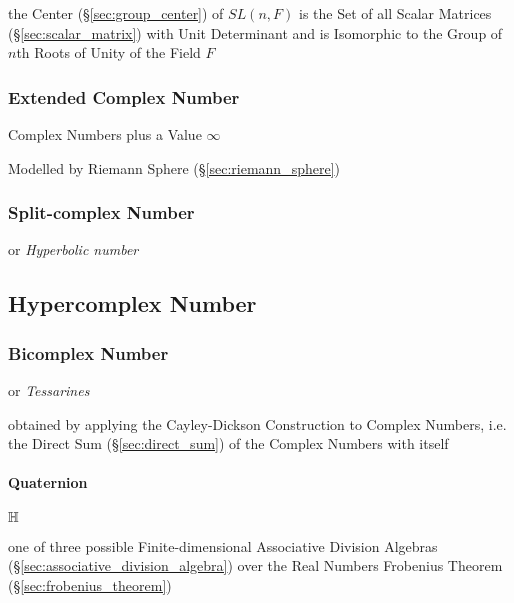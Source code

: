 the Center (\S\ref{sec:group_center}) of $SL(n,F)$ is the Set of all Scalar
Matrices (\S\ref{sec:scalar_matrix}) with Unit Determinant and is Isomorphic to
the Group of $n$th Roots of Unity of the Field $F$



\subsubsection{Extended Complex Number}\label{sec:extended_complex}

Complex Numbers plus a Value $\infty$

Modelled by Riemann Sphere (\S\ref{sec:riemann_sphere})



\subsubsection{Split-complex Number}\label{sec:split_complex}

or \emph{Hyperbolic number}



\subsection{Hypercomplex Number}\label{sec:hypercomplex_number}

\subsubsection{Bicomplex Number}\label{sec:bicomplex_number}

or \emph{Tessarines}

obtained by applying the Cayley-Dickson Construction to Complex Numbers, i.e.
the Direct Sum (\S\ref{sec:direct_sum}) of the Complex Numbers with itself



\paragraph{Quaternion}\label{sec:quaternion}\hfill

$\mathbb{H}$

one of three possible Finite-dimensional Associative Division Algebras
(\S\ref{sec:associative_division_algebra}) over the Real Numbers \fist
Frobenius Theorem (\S\ref{sec:frobenius_theorem})

